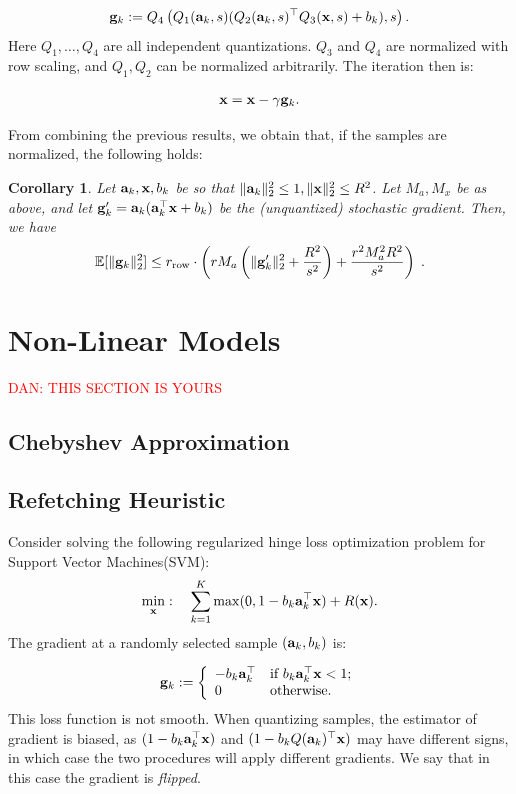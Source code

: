 \documentclass{article}
\def\a{{\bf a}}
\def\g{{\bf g}}
\def\x{{\bf x}}
\def\E{\mathbb{E}}
\def\rrow{r_\mathrm{row}}
\newtheorem{corollary}{Corollary}
\begin{document}
\begin{eqnarray}
	\g_k := Q_4 \left( Q_1(\a_k, s ) ( Q_2(\a_k, s)^\top Q_3(\x, s) + b_k) , s \right).
\end{eqnarray}
\noindent Here $Q_1, \ldots, Q_4$ are all independent quantizations.  $Q_3$ and  $Q_4$ are normalized with row scaling, and $Q_1, Q_2$ can be normalized arbitrarily.
The iteration then is: 

\begin{eqnarray}
	\x = \x - \gamma \g_k.
\end{eqnarray}

\noindent From combining the previous results, we obtain that, if the samples are normalized, the following holds:

\begin{corollary}
    \label{cor:full-quantization}
    Let $\a_k, \x, b_k$ be so that $\| \a_k \|_2^2 \leq 1, \| \x \|_2^2 \leq R^2$.
    Let $M_a, M_x$ be as above, and let $\g'_k = \a_k (\a_k^\top \x + b_k)$ be the (unquantized) stochastic gradient.
    Then, we have
    \[
    \E [\| \g_k \|_2^2] \leq \rrow \cdot \left( r M_a \left( \| \g'_k \|_2^2 + \frac{R^2}{s^2} \right)  + \frac{r^2 M_a^2 R^2}{s^2} \right) \; .
    \]
\end{corollary}

\section{Non-Linear Models}

\textcolor{red}{DAN: THIS SECTION IS YOURS}

\subsection{Chebyshev Approximation}

\subsection{Refetching Heuristic}

Consider solving the following regularized hinge loss optimization problem for Support Vector Machines(SVM):
\begin{align*}
\min_{\x}:\quad \sum_{k=1}^K \max(0, 1 - b_k \a_k^\top \x) + R(\x).
\end{align*}
The gradient at a randomly selected sample $(\a_k, b_k)$ is: 

\[
\g_k := \left\{ \begin{array}{ll}
         -b_k \a_k^\top & \mbox{if $b_k \a_k^\top \x < 1$};\\
         0 & \mbox{otherwise}. \end{array} \right.
\]
This loss function is not smooth. When quantizing samples, the estimator of gradient is biased, as $(1 - b_k \a_k^\top \x)$ and $(1 - b_k Q(\a_k)^\top \x)$ may have different signs, in which case the two procedures will apply different gradients. We say that in this case the gradient is \emph{flipped}. 
 
\end{document}

